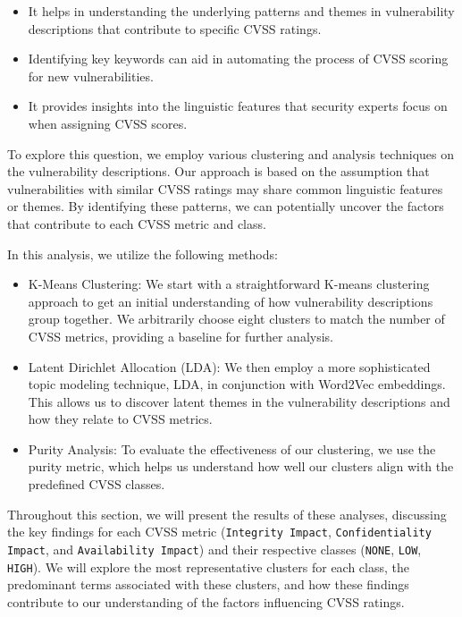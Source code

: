 \documentclass[12pt]{article}
\begin{document}
\begin{itemize}

	\item It helps in understanding the underlying patterns and themes in vulnerability descriptions
	      that contribute to specific CVSS ratings.

	\item Identifying key keywords can aid in automating the process of CVSS scoring for new
	      vulnerabilities.

	\item It provides insights into the linguistic features that security experts focus on when
	      assigning CVSS scores.

\end{itemize}

To explore this question, we employ various clustering and analysis techniques on the vulnerability
descriptions. Our approach is based on the assumption that vulnerabilities with similar CVSS ratings
may share common linguistic features or themes. By identifying these patterns, we can potentially
uncover the factors that contribute to each CVSS metric and class.

In this analysis, we utilize the following methods:

\begin{itemize}

	\item	K-Means Clustering: We start with a straightforward K-means clustering approach to get
	      an initial understanding of how vulnerability descriptions group together. We arbitrarily
	      choose eight clusters to match the number of CVSS metrics, providing a baseline for further
	      analysis.

	\item Latent Dirichlet Allocation (LDA): We then employ a more sophisticated topic modeling technique,
	      LDA, in conjunction with Word2Vec embeddings. This allows us to discover latent themes in the
	      vulnerability descriptions and how they relate to CVSS metrics.

	\item Purity Analysis: To evaluate the effectiveness of our clustering, we use the purity metric, which
	      helps us understand how well our clusters align with the predefined CVSS classes.

\end{itemize}



Throughout this section, we will present the results of these analyses, discussing the key findings
for each CVSS metric (\texttt{Integrity Impact}, \texttt{Confidentiality Impact}, and
\texttt{Availability Impact}) and their
respective classes (\texttt{NONE}, \texttt{LOW}, \texttt{HIGH}). We will explore the most representative clusters for each
class, the predominant terms associated with these clusters, and how these findings contribute to
our understanding of the factors influencing CVSS ratings.
\end{document}
